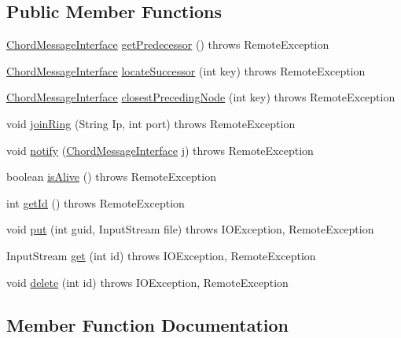 \subsection*{Public Member Functions}
\begin{DoxyCompactItemize}
\item 
\hyperlink{interface_chord_message_interface}{Chord\+Message\+Interface} \hyperlink{interface_chord_message_interface_ab07c08ba6088ef880eaf4ebae8281c51}{get\+Predecessor} ()  throws Remote\+Exception
\item 
\hyperlink{interface_chord_message_interface}{Chord\+Message\+Interface} \hyperlink{interface_chord_message_interface_a4e299d4b05537a4a07965dfe9f261fd0}{locate\+Successor} (int key)  throws Remote\+Exception
\item 
\hyperlink{interface_chord_message_interface}{Chord\+Message\+Interface} \hyperlink{interface_chord_message_interface_a7f47e9d5144a2af6904135bc05dfe8fd}{closest\+Preceding\+Node} (int key)  throws Remote\+Exception
\item 
void \hyperlink{interface_chord_message_interface_abc5a9483416a6b8ae7330b324869e236}{join\+Ring} (String Ip, int port)  throws Remote\+Exception
\item 
void \hyperlink{interface_chord_message_interface_abbb77f94541073d79284d35f970e0eb4}{notify} (\hyperlink{interface_chord_message_interface}{Chord\+Message\+Interface} j)  throws Remote\+Exception
\item 
boolean \hyperlink{interface_chord_message_interface_a8165b3fb53905e657c70b66223197561}{is\+Alive} ()  throws Remote\+Exception
\item 
int \hyperlink{interface_chord_message_interface_acead95d9a7196f05b656462ab78138eb}{get\+Id} ()  throws Remote\+Exception
\item 
void \hyperlink{interface_chord_message_interface_a59a01f2e913b6b2e4b60ba0b77c90eba}{put} (int guid, Input\+Stream file)  throws I\+O\+Exception, Remote\+Exception
\item 
Input\+Stream \hyperlink{interface_chord_message_interface_a4cdb461c48fe643f4fb5fa420d017eb3}{get} (int id)  throws I\+O\+Exception, Remote\+Exception
\item 
void \hyperlink{interface_chord_message_interface_ab4d46beae8cea347c827b5618ea16104}{delete} (int id)  throws I\+O\+Exception, Remote\+Exception
\end{DoxyCompactItemize}


\subsection{Member Function Documentation}
